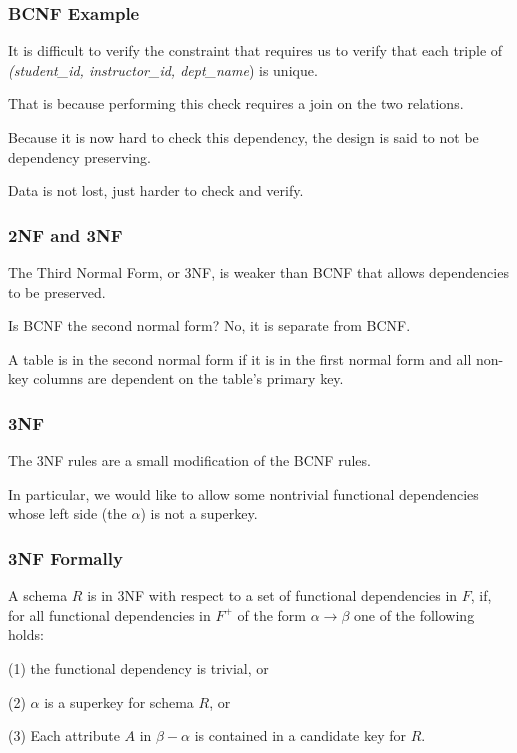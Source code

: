 \begin{frame}
\frametitle{BCNF Example}

It is difficult to verify the constraint that requires us to verify that each triple of \textit{(student\_id, instructor\_id, dept\_name}) is unique. 

That is because performing this check requires a join on the two relations. 

Because it is now hard to check this dependency, the design is said to not be \alert{dependency preserving}. 

Data is not lost, just harder to check and verify.

\end{frame}

\begin{frame}
\frametitle{2NF and 3NF}

The Third Normal Form, or 3NF, is weaker than BCNF that allows dependencies to be preserved. 

Is BCNF the second normal form? No, it is separate from BCNF. 

A table is in the second normal form if it is in the first normal form and all non-key columns are dependent on the table's primary key.

\end{frame}



\begin{frame}
\frametitle{3NF}

The 3NF rules are a small modification of the BCNF rules. 

In particular, we would like to allow some nontrivial functional dependencies whose left side (the $\alpha$) is not a superkey. 

\end{frame}


\begin{frame}
\frametitle{3NF Formally}
A schema $R$ is in 3NF with respect to a set of functional dependencies in $F$, if, for all functional dependencies in $F^{+}$ of the form $\alpha \rightarrow \beta$ one of the following holds: 

(1) the functional dependency is trivial, or 

(2) $\alpha$ is a superkey for schema $R$, or 

(3) Each attribute $A$ in $\beta - \alpha$ is contained in a candidate key for $R$.

\end{frame}



